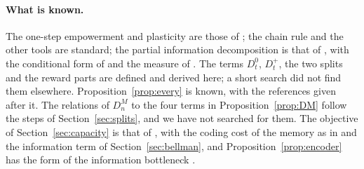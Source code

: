 \documentclass{article}
\theoremstyle{definition}
\theoremstyle{remark}
\begin{document}
\paragraph{What is known.} The one-step empowerment and plasticity are those of \citet{abel2025plasticity}; the chain rule and the other tools are standard; the partial information decomposition is that of \citet{williams2010nonnegative}, with the conditional form of \citet{matthias2025novel} and the measure of \citet{bertschinger2014quantifying}. The terms $D^0_t$, $D^+_t$, the two splits and the reward parts are defined and derived here; a short search did not find them elsewhere. Proposition~\ref{prop:every} is known, with the references given after it. The relations of $D^M_n$ to the four terms in Proposition~\ref{prop:DM} follow the steps of Section~\ref{sec:splits}, and we have not searched for them. The objective of Section~\ref{sec:capacity} is that of \citet{still2012information}, with the coding cost of the memory as in \citet{still2009information} and the information term of Section~\ref{sec:bellman}, and Proposition~\ref{prop:encoder} has the form of the information bottleneck \citep{tishby1999information}.



\end{document}
